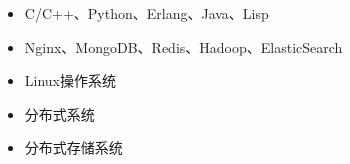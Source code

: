   \begin{itemize}[leftmargin=*]
    \item C/C++、Python、Erlang、Java、Lisp
    \item Nginx、MongoDB、Redis、Hadoop、ElasticSearch
    \item Linux操作系统
    \item 分布式系统
    \item 分布式存储系统
  \end{itemize}
